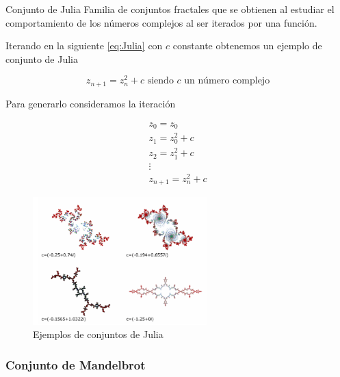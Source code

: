 \documentclass[8pt]{beamer}
\begin{document}
\begin{frame}
\begin{block}{Conjunto de Julia}
Familia de conjuntos fractales que se obtienen al estudiar el comportamiento de los números complejos al ser iterados por una función.

Iterando en la siguiente \ref{eq:Julia} con $c$ constante obtenemos un ejemplo de conjunto de Julia

\begin{equation}
z_{n+1} = z_n^2+c \text{ siendo } c \text{ un número complejo}
\end{equation}\label{eq:Julia}
\end{block}

Para generarlo consideramos la iteración

\begin{minipage}{0.3\textwidth}
\[\begin{array}{l}
z_0=z_0\\
z_1=z_0^2+c \\
z_2 = z_1^2 + c \\
\vdots \\
z_{n+1} = z_n^2+c
\end{array}\]
\end{minipage}
\begin{minipage}{0.68\textwidth}
\begin{figure}[hbtp]
\centering
\includegraphics[width = 0.6\textwidth]{img/Julia_sets.png}
\caption{Ejemplos de conjuntos de Julia}
\label{fig:Julia}
\end{figure}
\end{minipage}
\end{frame}

\subsubsection{Conjunto de Mandelbrot}
\end{document}
